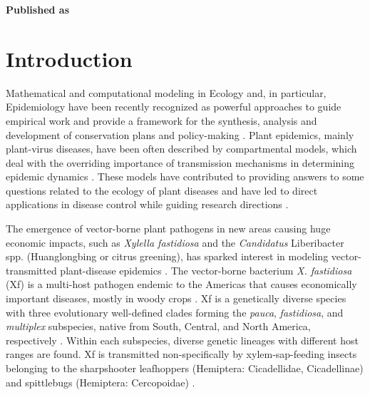 \vspace{3cm}





\textbf{Published as}

\vspace{0.5cm}


\newpage
\section{Introduction}

Mathematical and computational modeling in Ecology and, in particular,
Epidemiology have been recently recognized as powerful approaches to guide
empirical work and provide a framework for the synthesis, analysis and
development of conservation plans and policy-making
\cite{levin1992mathematics,Murray_book,sarkar2006biodiversity,Chew2014}.
Plant epidemics, mainly plant-virus diseases, have been often described by
compartmental models, which deal with the overriding importance of transmission
mechanisms in determining epidemic dynamics
\cite{Jeger1998,Jeger2004,Madden2000}. These models have contributed to
providing answers to some questions related to the ecology of plant diseases
and have led to direct applications in disease control while guiding research
directions \cite{Jeger2019}.

The emergence of vector-borne plant pathogens in new areas causing huge
economic impacts, such as \textit{Xylella fastidiosa} and the
\textit{Candidatus} Liberibacter spp. (Huanglongbing or citrus greening), has
sparked interest in modeling vector-transmitted plant-disease epidemics
\cite{chiyaka2012modeling,Jeger2019}. The vector-borne bacterium \textit{X.
    fastidiosa} (Xf) is a multi-host pathogen endemic to the Americas that
causes
economically important diseases, mostly in woody crops \cite{Hopkins2002}. Xf
is a genetically diverse species with three evolutionary well-defined clades
forming the \textit{pauca}, \textit{fastidiosa}, and \textit{multiplex}
subspecies, native from South, Central, and North America, respectively
\cite{vanhove2019genomic}. Within each subspecies, diverse genetic lineages
with different host ranges are found. Xf is transmitted non-specifically by
xylem-sap-feeding insects belonging to the sharpshooter leafhoppers (Hemiptera:
Cicadellidae, Cicadellinae) and spittlebugs (Hemiptera: Cercopoidae)
\cite{Redak2004}.

